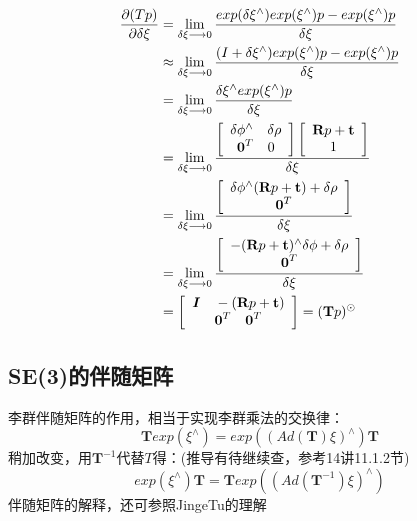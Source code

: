 \begin{equation}
\begin{aligned}
	\frac{\partial(Tp)}{\partial\delta\xi} &= \lim\limits_{\delta\xi\longrightarrow 0} \frac{exp(\delta\xi^\wedge)exp(\xi^\wedge)p - exp(\xi^\wedge)p}{\delta\xi} \\
	&\approx \lim\limits_{\delta\xi\longrightarrow 0} \frac{(I + \delta\xi^\wedge)exp(\xi^\wedge)p - exp(\xi^\wedge)p}{\delta\xi}\\
	&= \lim\limits_{\delta\xi\longrightarrow 0} \frac{\delta\xi^ \wedge exp(\xi^\wedge)p }{\delta\xi} \\
	&= \lim\limits_{\delta\xi\longrightarrow 0} \frac{
		\left[\begin{array}{cc}
	    	\delta\phi^\wedge \quad  \delta\rho \\
		    \textbf{0}^T      \quad  0
		\end{array}\right] 
		\left[\begin{array}{c}
	      \textbf{R}p+\textbf{t} \\
		  1
		\end{array}\right] }{\delta\xi} \\
	&= \lim\limits_{\delta\xi\longrightarrow 0} \frac{\left[\begin{array}{cc}
		\delta\phi^\wedge(\textbf{R}p+\textbf{t})+\delta\rho \\
		\textbf{0}^T    
		\end{array}\right] 
		}{\delta\xi} \\
	&= \lim\limits_{\delta\xi\longrightarrow 0} \frac{\left[\begin{array}{cc}
		-(\textbf{R}p+\textbf{t})^\wedge\delta\phi+\delta\rho \\
		\textbf{0}^T    
		\end{array}\right]
	}{\delta\xi} \\
    &= \left[\begin{array}{cc}
         \textbf{\textit{I}} \quad  -(\textbf{R}p+\textbf{t}) \\
         \textbf{0}^T        \quad  \textbf{0}^T 
       \end{array}\right] = (\textbf{T}p)^\odot
\end{aligned}
\end{equation}

\subsection{SE(3)的伴随矩阵}
李群伴随矩阵的作用，相当于实现李群乘法的交换律：
\begin{equation}
\textbf{T}exp(\xi^\wedge)=exp((Ad(\textbf{T})\xi)^\wedge)\textbf{T}
\end{equation}
稍加改变，用$\textbf{T}^{-1}$代替$T$得：(推导有待继续查，参考14讲11.1.2节)
\begin{equation}
exp(\xi^\wedge)\textbf{T} = \textbf{T}exp((Ad(\textbf{T}^{-1})\xi)^\wedge)
\end{equation}
伴随矩阵的解释，还可参照JingeTu的理解

